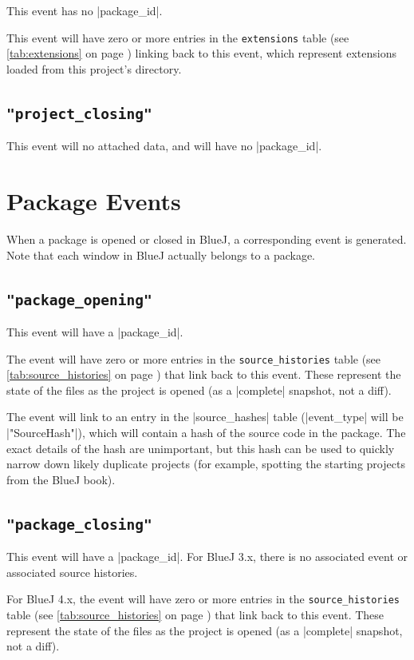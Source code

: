 \documentclass{report}
\newcommand{\myref}[1]{\autoref{#1} on page \pageref*{#1}}
\newcommand{\tabref}[1]{\lstinline|#1| table (see \myref{tab:#1})}
\newcommand{\intern}{This table may be interned, see \myref{def:intern}.}
\begin{document}
This event has no |package_id|.

This event will have zero or more entries in the \tabref{extensions} linking
back to this event, which represent extensions loaded from this project's directory.

\subsection{\lstinline!"project_closing"!}

This event will no attached data, and will have no |package_id|.

\section{Package Events}

When a package is opened or closed in BlueJ, a corresponding event is
generated.  Note that each window in BlueJ actually belongs to a package.

\subsection{\lstinline!"package_opening"!}

This event will have a |package_id|.

The event will have zero or more entries in the \tabref{source_histories} that
link back to this event.  These represent the state of the files as the project is
opened (as a |complete| snapshot, not a diff).

The event will link to an entry in the |source_hashes| table
(|event_type| will be |"SourceHash"|), which will contain a hash of
the source code in the package.  The exact details of the hash are
unimportant, but this hash can be used to quickly narrow down likely
duplicate projects (for example, spotting the starting projects from
the BlueJ book).


\subsection{\lstinline!"package_closing"!}

This event will have a |package_id|.  For BlueJ 3.x, there is no associated
event or associated source histories.

For BlueJ 4.x, the event will have zero or more entries in the \tabref{source_histories} that
link back to this event.  These represent the state of the files as the project is
opened (as a |complete| snapshot, not a diff).
\end{document}
